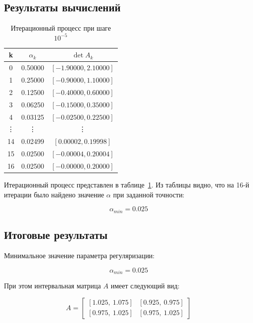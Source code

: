 \documentclass{article}
\begin{document}
  \clearpage

  \subsection{Результаты вычислений}

  \begin{table}[htbp!]
    \centering
    \renewcommand{\arraystretch}{1.2}
    \begin{tabular}{|c|c|c|}
      \hline
      k & \( \alpha_k \) & \( \det A_k \) \\
      \hline
      0 & 0.50000 & \([-1.90000, 2.10000]\) \\
      \hline
      1 & 0.25000 & \([-0.90000, 1.10000]\) \\
      \hline
      2 & 0.12500 & \([-0.40000, 0.60000]\) \\
      \hline
      3 & 0.06250 & \([-0.15000, 0.35000]\) \\
      \hline
      4 & 0.03125 & \([-0.02500, 0.22500]\) \\

      \hline
      \vdots & \vdots & \vdots \\
      \hline

      14 & 0.02499 & \([0.00002, 0.19998]\) \\
      \hline
      15 & 0.02500 & \([-0.00004, 0.20004]\) \\
      \hline
      16 & 0.02500 & \([-0.00000, 0.20000]\) \\
      \hline
    \end{tabular}
    \caption{Итерационный процесс при шаге \( 10^{-5} \)}
    \label{table:iterations}
  \end{table}

  Итерационный процесс представлен в таблице~\ref{table:iterations}.
  Из таблицы видно, что на 16-й итерации было найдено значение \( \alpha \)
  при заданной точности:

  \[ \alpha_{min} = 0.025 \]

  \subsection{Итоговые результаты}

  Минимальное значение параметра регуляризации:

  \[ \alpha_{min} = 0.025 \]

  При этом интервальная матрица \(A\) имеет следующий вид:

  \[
    A = \begin{bmatrix}
      [1.025,\ 1.075] & [0.925,\ 0.975] \\
      [0.975,\ 1.025] & [0.975,\ 1.025]
    \end{bmatrix}
  \]
\end{document}
